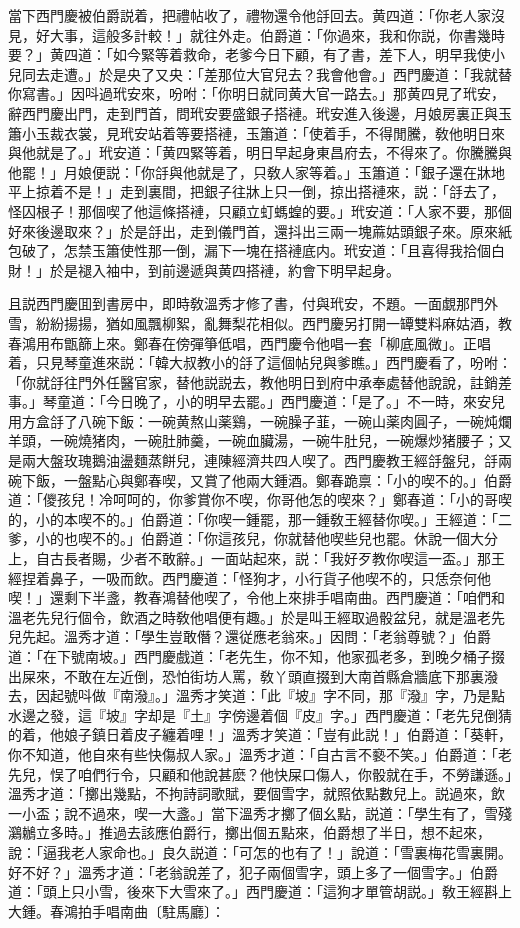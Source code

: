 當下西門慶被伯爵説着，把禮帖收了，禮物還令他㧱回去。黄四道：「你老人家沒見，好大事，這般多計較！」就往外走。伯爵道：「你過來，我和你説，你書幾時要？」黄四道：「如今緊等着救命，老爹今日下顧，有了書，差下人，明早我使小兒同去走遭。」於是央了又央：「差那位大官兒去？我會他會。」西門慶道：「我就替你寫書。」因呌過玳安來，吩咐：「你明日就同黄大官一路去。」那黄四見了玳安，辭西門慶出門，走到門首，問玳安要盛銀子搭褳。玳安進入後邊，月娘房裏正與玉簫小玉裁衣裳，見玳安站着等要搭褳，玉簫道：「使着手，不得閒騰，敎他明日來與他就是了。」玳安道：「黄四緊等着，明日早起身東昌府去，不得來了。你騰騰與他罷！」月娘便説：「你㧱與他就是了，只敎人家等着。」玉簫道：「銀子還在牀地平上掠着不是！」走到裏間，把銀子往牀上只一倒，掠出搭褳來，説：「㧱去了，怪囚根子！那個喫了他這條搭褳，只顧立虰螞蝗的要。」玳安道：「人家不要，那個好來後邊取來？」於是㧱出，走到儀門首，還抖出三兩一塊蔴姑頭銀子來。原來紙包破了，怎禁玉簫使性那一倒，漏下一塊在搭褳底内。玳安道：「且喜得我拾個白財！」於是褪入袖中，到前邊遞與黄四搭褳，約會下明早起身。

且説西門慶囬到書房中，即時敎溫秀才修了書，付與玳安，不題。一面覷那門外雪，紛紛揚揚，猶如風飄柳絮，亂舞梨花相似。西門慶另打開一罈雙料麻姑酒，教春鴻用布甑篩上來。鄭春在傍彈箏低唱，西門慶令他唱一套「柳底風微」。正唱着，只見琴童進來説：「韓大叔教小的㧱了這個帖兒與爹瞧。」西門慶看了，吩咐：「你就㧱往門外任醫官家，替他説説去，教他明日到府中承奉處替他說說，註銷差事。」琴童道：「今日晚了，小的明早去罷。」西門慶道：「是了。」不一時，來安兒用方盒㧱了八碗下飯：一碗黄熬山薬鷄，一碗臊子韮，一碗山薬肉圓子，一碗炖爛羊頭，一碗燒猪肉，一碗肚肺羹，一碗血臟湯，一碗牛肚兒，一碗爆炒猪腰子；又是兩大盤玫瑰鵝油盪麵蒸餅兒，連陳經濟共四人喫了。西門慶教王經㧱盤兒，㧱兩碗下飯，一盤點心與鄭春喫，又賞了他兩大鍾酒。鄭春跪禀：「小的喫不的。」伯爵道：「儍孩兒！冷呵呵的，你爹賞你不喫，你哥他怎的喫來？」鄭春道：「小的哥喫的，小的本喫不的。」伯爵道：「你喫一鍾罷，那一鍾敎王經替你喫。」王經道：「二爹，小的也喫不的。」伯爵道：「你這孩兒，你就替他喫些兒也罷。休說一個大分上，自古長者賜，少者不敢辭。」一面站起來，説：「我好歹教你喫這一盃。」那王經捏着鼻子，一吸而飲。西門慶道：「怪狗才，小行貨子他喫不的，只恁奈何他喫！」還剩下半盞，教春鴻替他喫了，令他上來排手唱南曲。西門慶道：「咱們和溫老先兒行個令，飲酒之時敎他唱便有趣。」於是叫王經取過骰盆兒，就是溫老先兒先起。溫秀才道：「學生豈敢僭？還従應老翁來。」因問：「老翁尊號？」伯爵道：「在下號南坡。」西門慶戲道：「老先生，你不知，他家孤老多，到晚夕桶子掇出屎來，不敢在左近倒，恐怕街坊人罵，敎丫頭直掇到大南首縣倉牆底下那裏潑去，因起號呌做『南潑』。」溫秀才笑道：「此『坡』字不同，那『潑』字，乃是點水邊之發，這『坡』字却是『土』字傍邊着個『皮』字。」西門慶道：「老先兒倒猜的着，他娘子鎮日着皮子纏着哩！」溫秀才笑道：「豈有此説！」伯爵道：「葵軒，你不知道，他自來有些快傷叔人家。」溫秀才道：「自古言不褻不笑。」伯爵道：「老先兒，悮了咱們行令，只顧和他說甚麽？他快屎口傷人，你骰就在手，不勞謙遜。」溫秀才道：「擲出幾點，不拘詩詞歌賦，要個雪字，就照依點數兒上。説過來，飲一小盃；說不過來，喫一大盞。」當下溫秀才擲了個幺點，説道：「學生有了，雪殘鸂鶒立多時。」推過去該應伯爵行，擲出個五點來，伯爵想了半日，想不起來，說：「逼我老人家命也。」良久説道：「可怎的也有了！」說道：「雪裏梅花雪裏開。好不好？」溫秀才道：「老翁說差了，犯子兩個雪字，頭上多了一個雪字。」伯爵道：「頭上只小雪，後來下大雪來了。」西門慶道：「這狗才單管胡説。」敎王經斟上大鍾。春鴻拍手唱南曲〔駐馬廳〕：

